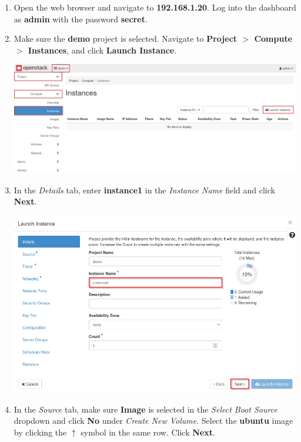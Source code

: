 \documentclass[letterpaper, 12pt]{article}
\begin{document}
\begin{enumerate}
    \item Open the web browser and navigate to \textbf{192.168.1.20}.
    Log into the dashboard as \textbf{admin} with the password \textbf{secret}.

    \item Make sure the \textbf{demo} project is selected.
    Navigate to \textbf{Project $>$ Compute $>$ Instances}, and click \textbf{Launch Instance}.

    \begin{center}
        \includegraphics[width=\linewidth]{images/part2/step2.png}
    \end{center}

    \item In the \textit{Details} tab, enter \textbf{instance1} in the \textit{Instance Name} field and click
    \textbf{Next}.

    \begin{center}
        \includegraphics[width=\linewidth]{images/part2/step3.png}
    \end{center}

    \item In the \textit{Source} tab, make sure \textbf{Image} is selected in the \textit{Select Boot Source} dropdown and click \textbf{No} under \textit{Create New Volume}.
    Select the \textbf{ubuntu} image by clicking the $\uparrow$ symbol in the same row.
    Click \textbf{Next}.


\end{enumerate}
\end{document}
